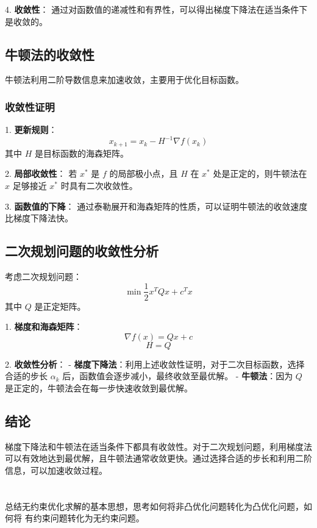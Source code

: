 \documentclass[a4paper]{article}
\begin{document}
4. \textbf{收敛性}：
   通过对函数值的递减性和有界性，可以得出梯度下降法在适当条件下是收敛的。

\subsection{牛顿法的收敛性}

牛顿法利用二阶导数信息来加速收敛，主要用于优化目标函数。

\subsubsection{收敛性证明}

1. \textbf{更新规则}：
   \[
   x_{k+1} = x_k - H^{-1} \nabla f(x_k)
   \]
   其中 $H$ 是目标函数的海森矩阵。

2. \textbf{局部收敛性}：
   若 $x^*$ 是 $f$ 的局部极小点，且 $H$ 在 $x^*$ 处是正定的，则牛顿法在 $x$ 足够接近 $x^*$ 时具有二次收敛性。

3. \textbf{函数值的下降}：
   通过泰勒展开和海森矩阵的性质，可以证明牛顿法的收敛速度比梯度下降法快。

\subsection{二次规划问题的收敛性分析}

考虑二次规划问题：
\[
\min \frac{1}{2} x^T Q x + c^T x
\]
其中 $Q$ 是正定矩阵。

1. \textbf{梯度和海森矩阵}：
   \[
   \nabla f(x) = Qx + c
   \]
   \[
   H = Q
   \]

2. \textbf{收敛性分析}：
   - \textbf{梯度下降法}：利用上述收敛性证明，对于二次目标函数，选择合适的步长 $\alpha_k$ 后，函数值会逐步减小，最终收敛至最优解。
   - \textbf{牛顿法}：因为 $Q$ 是正定的，牛顿法会在每一步快速收敛到最优解。

\subsection{结论}

梯度下降法和牛顿法在适当条件下都具有收敛性。对于二次规划问题，利用梯度法可以有效地达到最优解，且牛顿法通常收敛更快。通过选择合适的步长和利用二阶信息，可以加速收敛过程。

\section{}
总结无约束优化求解的基本思想，思考如何将非凸优化问题转化为凸优化问题，如何将
有约束问题转化为无约束问题。
\end{document}
